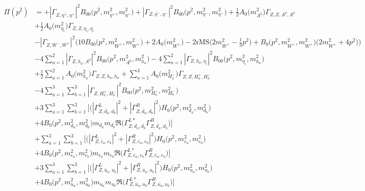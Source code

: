 \begin{itemize}
\begin{align} 
\Pi(p^2) &= +|{\Gamma_{Z,\bar{\eta^+},\eta^+}}|^2 {B_{00}\Big(p^{2},m^2_{\eta^+},m^2_{\eta^+}\Big)} +|{\Gamma_{Z,\bar{\eta^-},\eta^-}}|^2 {B_{00}\Big(p^{2},m^2_{\eta^-},m^2_{\eta^-}\Big)} +\frac{1}{2} {A_0\Big(m^2_{A^0}\Big)} {\Gamma_{Z,Z,A^0,A^0}} \nonumber \\ 
 &+\frac{1}{2} {A_0\Big(m^2_{\eta_i}\Big)} {\Gamma_{Z,Z,\eta_i,\eta_i}} \nonumber \\ 
 &- |{\Gamma_{Z,W^-,W^+}}|^2 \Big(10 {B_{00}\Big(p^{2},m^2_{W^+},m^2_{W^+}\Big)}  + 2 {A_0\Big(m^2_{W^+}\Big)}  -2 \text{rMS} \Big(2 m^2_{W^+}  -\frac{1}{3} p^{2} \Big) + {B_0\Big(p^{2},m^2_{W^+},m^2_{W^+}\Big)} \Big(2 m^2_{W^+}  + 4 p^{2} \Big)\Big)\nonumber \\ 
 &-4 \sum_{a=1}^{2}|{\Gamma_{Z,h_{{a}},A^0}}|^2 {B_{00}\Big(p^{2},m^2_{A^0},m^2_{h_{{a}}}\Big)}  -4 \sum_{a=1}^{2}|{\Gamma_{Z,h_{{a}},\eta_i}}|^2 {B_{00}\Big(p^{2},m^2_{\eta_i},m^2_{h_{{a}}}\Big)}  \nonumber \\ 
 &+\frac{1}{2} \sum_{a=1}^{2}{A_0\Big(m^2_{h_{{a}}}\Big)} {\Gamma_{Z,Z,h_{{a}},h_{{a}}}}  +\sum_{a=1}^{3}{A_0\Big(m^2_{H^-_{{a}}}\Big)} {\Gamma_{Z,Z,H^+_{{a}},H^-_{{a}}}} \nonumber \\ 
 &-4 \sum_{a=1}^{3}\sum_{b=1}^{3}|{\Gamma_{Z,H^+_{{a}},H^-_{{b}}}}|^2 {B_{00}\Big(p^{2},m^2_{H^-_{{a}}},m^2_{H^-_{{b}}}\Big)}  \nonumber \\ 
 &+3 \sum_{a=1}^{3}\sum_{b=1}^{3} \Big[\Big(|{\Gamma^L_{Z,\bar{d}_{{a}},d_{{b}}}}|^2 + |{\Gamma^R_{Z,\bar{d}_{{a}},d_{{b}}}}|^2\Big){H_0\Big(p^{2},m^2_{d_{{a}}},m^2_{d_{{b}}}\Big)} \nonumber \\ & +4 {B_0\Big(p^{2},m^2_{d_{{a}}},m^2_{d_{{b}}}\Big)} m_{d_{{a}}} m_{d_{{b}}} {\Re\Big({\Gamma^{L*}_{Z,\bar{d}_{{a}},d_{{b}}}} {\Gamma^R_{Z,\bar{d}_{{a}},d_{{b}}}} \Big)} \Big] \nonumber \\ 
 &+\sum_{a=1}^{3}\sum_{b=1}^{3} \Big[\Big(|{\Gamma^L_{Z,\bar{e}_{{a}},e_{{b}}}}|^2 + |{\Gamma^R_{Z,\bar{e}_{{a}},e_{{b}}}}|^2\Big){H_0\Big(p^{2},m^2_{e_{{a}}},m^2_{e_{{b}}}\Big)} \nonumber \\ & +4 {B_0\Big(p^{2},m^2_{e_{{a}}},m^2_{e_{{b}}}\Big)} m_{e_{{a}}} m_{e_{{b}}} {\Re\Big({\Gamma^{L*}_{Z,\bar{e}_{{a}},e_{{b}}}} {\Gamma^R_{Z,\bar{e}_{{a}},e_{{b}}}} \Big)} \Big]\nonumber \\ 
 &+3 \sum_{a=1}^{3}\sum_{b=1}^{3} \Big[\Big(|{\Gamma^L_{Z,\bar{u}_{{a}},u_{{b}}}}|^2 + |{\Gamma^R_{Z,\bar{u}_{{a}},u_{{b}}}}|^2\Big){H_0\Big(p^{2},m^2_{u_{{a}}},m^2_{u_{{b}}}\Big)} \nonumber \\ & +4 {B_0\Big(p^{2},m^2_{u_{{a}}},m^2_{u_{{b}}}\Big)} m_{u_{{a}}} m_{u_{{b}}} {\Re\Big({\Gamma^{L*}_{Z,\bar{u}_{{a}},u_{{b}}}} {\Gamma^R_{Z,\bar{u}_{{a}},u_{{b}}}} \Big)} \Big] \nonumber \\ 

\end{align}
\end{itemize}
